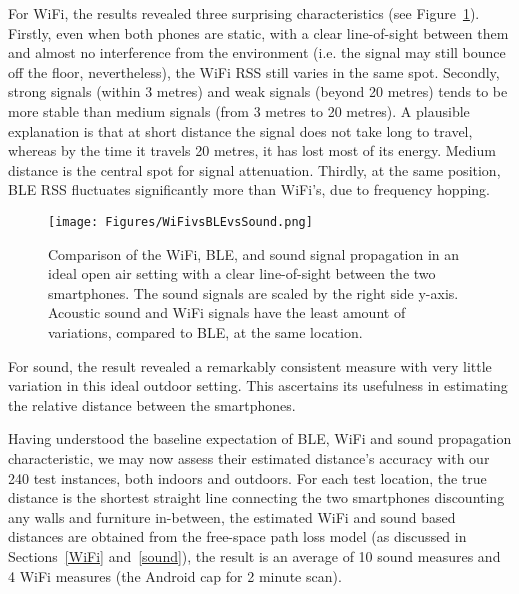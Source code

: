 \documentclass[graybox]{svmult}
\begin{document}
For WiFi, the results revealed three surprising characteristics (see Figure~\ref{WiFivsBLEvsSound}). Firstly, even when both phones are static, with a clear line-of-sight between them and almost no interference from the environment (i.e. the signal may still bounce off the floor, nevertheless), the WiFi RSS still varies in the same spot. Secondly, strong signals (within 3 metres) and weak signals (beyond 20 metres) tends to be more stable than medium signals (from 3 metres to 20 metres). A plausible explanation is that at short distance the signal does not take long to travel, whereas by the time it travels 20 metres, it has lost most of its energy. Medium distance is the central spot for signal attenuation. Thirdly, at the same position, BLE RSS fluctuates significantly more than WiFi's, due to frequency hopping.
\begin{figure}[h]
    \centering
    \sidecaption
    \texttt{[image: Figures/WiFivsBLEvsSound.png]}
    \caption{Comparison of the WiFi, BLE, and sound signal propagation in an ideal open air setting with a clear line-of-sight between the two smartphones. The sound signals are scaled by the right side y-axis. Acoustic sound and WiFi signals have the least amount of variations, compared to BLE, at the same location.}
    \label{WiFivsBLEvsSound}       
\end{figure}

For sound, the result revealed a remarkably consistent measure with very little variation in this ideal outdoor setting. This ascertains its usefulness in estimating the relative distance between the smartphones.

Having understood the baseline expectation of BLE, WiFi and sound propagation characteristic, we may now assess their estimated distance's accuracy with our 240 test instances, both indoors and outdoors. For each test location, the true distance is the shortest straight line connecting the two smartphones discounting any walls and furniture in-between, the estimated WiFi and sound based distances are obtained from the free-space path loss model (as discussed in Sections~\ref{WiFi} and~\ref{sound}), the result is an average of 10 sound measures and 4 WiFi measures (the Android cap for 2 minute scan).
\end{document}
